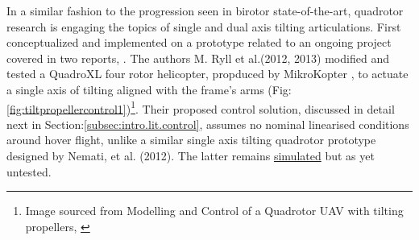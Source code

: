 \par
In a similar fashion to the progression seen in birotor state-of-the-art, quadrotor research is engaging the topics of single and dual axis tilting articulations. First conceptualized and implemented on a prototype related to an ongoing project covered in two reports, \cite{tiltpropellercontrol,tiltpropellerflight}. The authors M. Ryll et al.(2012, 2013) modified and tested a QuadroXL four rotor helicopter, propduced by MikroKopter \cite{mikrokopter}, to actuate a single axis of tilting aligned with the frame's arms (Fig:\ref{fig:tiltpropellercontrol1})\footnote{Image sourced from Modelling and Control of a Quadrotor UAV with tilting propellers, \cite{tiltpropellercontrol}}. Their proposed control solution, discussed in detail next in Section:\ref{subsec:intro.lit.control}, assumes no nominal linearised conditions around hover flight, unlike a similar single axis tilting quadrotor prototype designed by Nemati, et al. (2012)\cite{singleaxistilting}. The latter remains  \underline{simulated} but as yet untested.
